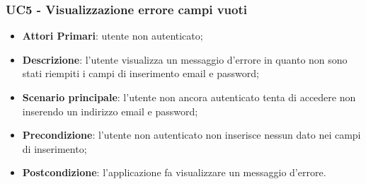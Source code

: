 \subsubsection{UC5 - Visualizzazione errore campi vuoti}
\begin{itemize}
	\item \textbf{Attori Primari}: utente non autenticato;
	\item \textbf{Descrizione}: l'utente visualizza un messaggio d'errore in quanto non sono stati riempiti i campi di inserimento email e password;
	\item \textbf{Scenario principale}: l'utente non ancora autenticato tenta di accedere non inserendo un indirizzo email e password;	
	\item \textbf{Precondizione}: l'utente non autenticato non inserisce nessun dato nei campi di inserimento;
	\item \textbf{Postcondizione}: l'applicazione fa visualizzare un messaggio d'errore.
\end{itemize}